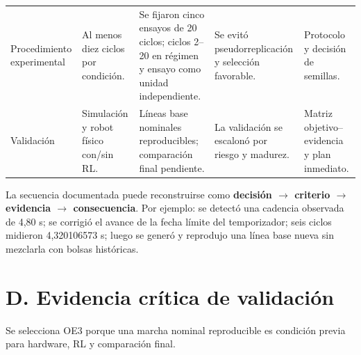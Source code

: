 \documentclass[11pt,letterpaper]{article}
\begin{document}
\begin{landscape}
\begin{longtable}{p{2.4cm}p{4.2cm}p{5cm}p{5cm}p{4cm}}
Procedimiento experimental & Al menos diez ciclos por condición. & Se fijaron cinco ensayos de 20 ciclos; ciclos 2--20 en régimen y ensayo como unidad independiente. & Se evitó pseudorreplicación y selección favorable. & Protocolo y decisión de semillas.\\
Validación & Simulación y robot físico con/sin RL. & Líneas base nominales reproducibles; comparación final pendiente. & La validación se escalonó por riesgo y madurez. & Matriz objetivo--evidencia y plan inmediato.\\
\bottomrule
\end{longtable}
\end{landscape}

La secuencia documentada puede reconstruirse como
\textbf{decisión $\rightarrow$ criterio $\rightarrow$ evidencia $\rightarrow$
consecuencia}. Por ejemplo: se detectó una cadencia observada de 4,80 s;
se corrigió el avance de la fecha límite del temporizador; seis ciclos midieron
4,320106573 s; luego se generó y reprodujo una línea base nueva sin mezclarla
con bolsas históricas.

\section{D. Evidencia crítica de validación}

Se selecciona OE3 porque una marcha nominal reproducible es condición previa
para hardware, RL y comparación final.
\end{document}
